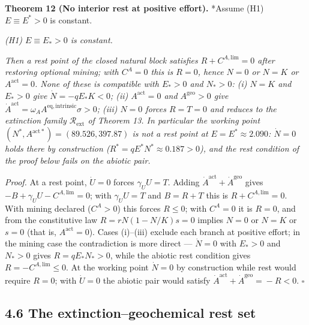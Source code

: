 \documentclass[11pt]{article}
\begin{document}
\textbf{Theorem 12 (No interior rest at positive effort).} *Assume (H1) \(E\equiv E^*>0\) is constant.

\emph{(H1) \(E \equiv E_* > 0\) is constant.}

\emph{Then a rest point of the closed natural block satisfies \(R + C^{A,\mathrm{lim}} = 0\) after restoring optional mining; with \(C^A = 0\) this is \(R = 0\), hence \(N = 0\) or \(N = K\) or \(A^{\mathrm{act}} = 0\). None of these is compatible with \(E_* > 0\) and \(N_* > 0\): (i) \(N = K\) and \(E_* > 0\) give \(\dot N = -qE_* K < 0\); (ii) \(A^{\mathrm{act}} = 0\) and \(A^{\mathrm{geo}} > 0\) give \(\dot A^{\mathrm{act}} =\allowbreak{} \omega_A A^{\mathrm{eq,\allowbreak{}intrinsic}} \sigma > 0\); (iii) \(N = 0\) forces \(R = T = 0\) and reduces to the extinction family \(\mathcal{R}_{\mathrm{ext}}\) of Theorem 13. In particular the working point \((N^*,\allowbreak{} A^{\mathrm{act}*}) =\allowbreak{} (89.526,\allowbreak{} 397.87)\) is not a rest point at \(E = E^* \approx 2.090\): \(\dot N = 0\) holds there by construction (\(R^* =\allowbreak{} qE^*N^* \approx 0.187 > 0\)), and the rest condition of the proof below fails on the abiotic pair.}

\emph{Proof.} At a rest point, \(\dot U = 0\) forces \(\gamma_U U = T\). Adding \(\dot A^{\mathrm{act}} +\allowbreak{} \dot A^{\mathrm{geo}}\) gives \(-B +\allowbreak{} \gamma_U U - C^{A,\allowbreak{}\mathrm{lim}} =\allowbreak{} 0\); with \(\gamma_U U = T\) and \(B = R + T\) this is \(R + C^{A,\mathrm{lim}} = 0\). With mining declared (\(C^A > 0\)) this forces \(R \le 0\); with \(C^A = 0\) it is \(R = 0\), and from the constitutive law \(R =\allowbreak{} rN(1 - N/\allowbreak{}K)s =\allowbreak{} 0\) implies \(N = 0\) or \(N = K\) or \(s = 0\) (that is, \(A^{\mathrm{act}} = 0\)). Cases (i)--(iii) exclude each branch at positive effort; in the mining case the contradiction is more direct --- \(\dot N = 0\) with \(E_* > 0\) and \(N_* > 0\) gives \(R = qE_*N_* > 0\), while the abiotic rest condition gives \(R = -C^{A,\mathrm{lim}} \le 0\). At the working point \(\dot N = 0\) by construction while rest would require \(R = 0\); with \(\dot U = 0\) the abiotic pair would satisfy \(\dot A^{\mathrm{act}} +\allowbreak{} \dot A^{\mathrm{geo}} =\allowbreak{} -R < 0\). \(\square\)

\subsection*{4.6 The extinction--geochemical rest set}\label{46-the-extinction--geochemical-rest-set}
\end{document}
